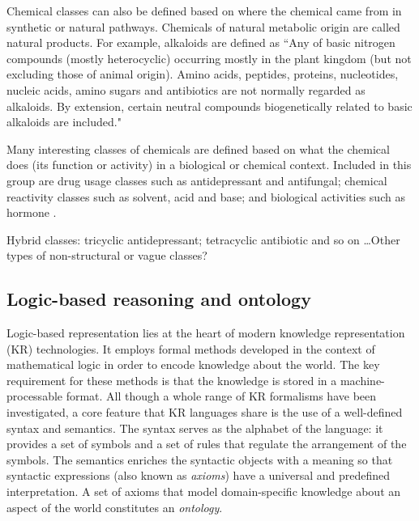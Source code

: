 \documentclass[10pt]{bmc_article}
\newenvironment{bmcformat}{\baselineskip20pt\sloppy\setboolean{publ}{false}}{\baselineskip20pt\sloppy}
\begin{document}
\begin{bmcformat}
Chemical classes can also be defined based on where the chemical came from in synthetic or natural pathways. Chemicals of natural metabolic origin are called natural products.  For example, alkaloids are defined as ``Any of basic nitrogen compounds (mostly heterocyclic) occurring mostly in the plant kingdom (but not excluding those of animal origin). Amino acids, peptides, proteins, nucleotides, nucleic acids, amino sugars and antibiotics are not normally regarded as alkaloids. By extension, certain neutral compounds biogenetically related to basic alkaloids are included."

Many interesting classes of chemicals are defined based on what the chemical does (its function or activity) in a biological or chemical context. Included in this group are drug usage classes such as antidepressant and antifungal; chemical reactivity classes such as solvent, acid and base; and biological activities such as hormone \cite{batchelor2010}. 


Hybrid classes:  tricyclic antidepressant; tetracyclic antibiotic and so on \ldots  Other types of non-structural or vague classes? 


\subsection*{Logic-based reasoning and ontology}
\label{sec:backlogic}

Logic-based representation lies at the heart of modern knowledge representation (KR) technologies. It employs formal methods developed in the context of mathematical logic in order to encode knowledge about the world. The key requirement for these methods is that the knowledge is stored in a machine-processable format. All though a whole range of KR formalisms have been investigated, a core feature that KR languages share is the use of a well-defined syntax and semantics. The syntax serves as the alphabet of the language: it provides a set of symbols and a set of rules that regulate the arrangement of the symbols. The semantics enriches the syntactic objects with a meaning so that syntactic expressions (also known as \emph{axioms}) have a universal and predefined interpretation. A set of axioms that model domain-specific knowledge about an aspect of the world constitutes an \emph{ontology}. 


\end{bmcformat}
\end{document}
